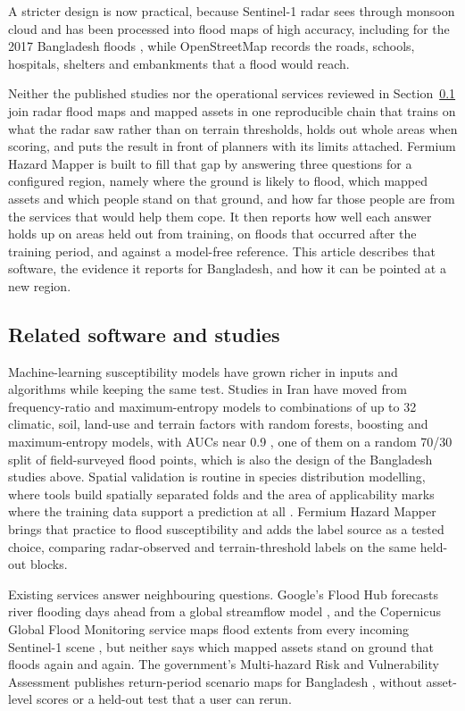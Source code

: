 \documentclass[preprint,12pt]{elsarticle}
\begin{document}
A stricter design is now practical, because Sentinel-1 radar sees through monsoon cloud and has been processed into flood maps of high accuracy, including for the 2017 Bangladesh floods \citep{twele2016, uddin2019}, while OpenStreetMap records the roads, schools, hospitals, shelters and embankments that a flood would reach.

Neither the published studies nor the operational services reviewed in Section~\ref{sec:related} join radar flood maps and mapped assets in one reproducible chain that trains on what the radar saw rather than on terrain thresholds, holds out whole areas when scoring, and puts the result in front of planners with its limits attached. Fermium Hazard Mapper is built to fill that gap by answering three questions for a configured region, namely where the ground is likely to flood, which mapped assets and which people stand on that ground, and how far those people are from the services that would help them cope. It then reports how well each answer holds up on areas held out from training, on floods that occurred after the training period, and against a model-free reference. This article describes that software, the evidence it reports for Bangladesh, and how it can be pointed at a new region.

\subsection{Related software and studies}
\label{sec:related}

Machine-learning susceptibility models have grown richer in inputs and algorithms while keeping the same test. Studies in Iran have moved from frequency-ratio and maximum-entropy models \citep{siahkamari2018} to combinations of up to 32 climatic, soil, land-use and terrain factors with random forests, boosting and maximum-entropy models, with AUCs near 0.9 \citep{haghizadeh2025, mirzapour2025}, one of them on a random 70/30 split of field-surveyed flood points, which is also the design of the Bangladesh studies above. Spatial validation is routine in species distribution modelling, where tools build spatially separated folds \citep{valavi2019} and the area of applicability marks where the training data support a prediction at all \citep{meyer2021}. Fermium Hazard Mapper brings that practice to flood susceptibility and adds the label source as a tested choice, comparing radar-observed and terrain-threshold labels on the same held-out blocks.

Existing services answer neighbouring questions. Google's Flood Hub forecasts river flooding days ahead from a global streamflow model \citep{nearing2024}, and the Copernicus Global Flood Monitoring service maps flood extents from every incoming Sentinel-1 scene \citep{salamon2021}, but neither says which mapped assets stand on ground that floods again and again. The government's Multi-hazard Risk and Vulnerability Assessment publishes return-period scenario maps for Bangladesh \citep{ddm_mrva}, without asset-level scores or a held-out test that a user can rerun.
\end{document}
